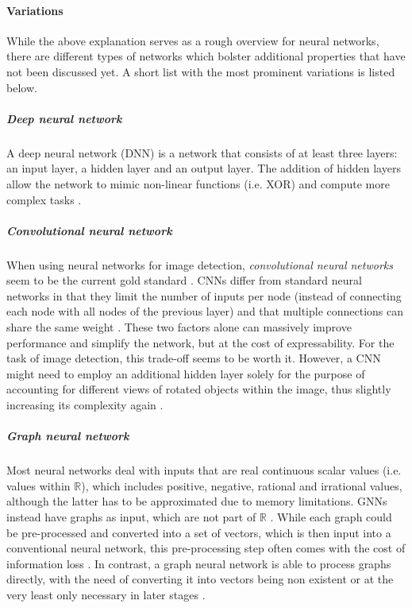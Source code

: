 \documentclass[draft,final]{vutinfth} %
\begin{document}
\paragraph{Variations} While the above explanation serves as a rough overview for neural networks, there are different types of networks which bolster additional properties that have not been discussed yet. A short list with the most prominent variations is listed below.

\subparagraph{Deep neural network} A deep neural network (DNN) is a network that consists of at least three layers: an input layer, a hidden layer and an output layer. The addition of hidden layers allow the network to mimic non-linear functions (i.e. XOR) and compute more complex tasks \cite{borisov2022deep}.

\subparagraph{Convolutional neural network} When using neural networks for image detection, \emph{convolutional neural networks} seem to be the current gold standard \cite{li2021survey}. CNNs differ from standard neural networks in that they limit the number of inputs per node (instead of connecting each node with all nodes of the previous layer) and that multiple connections can share the same weight \cite{li2021survey}. These two factors alone can massively improve performance and simplify the network, but at the cost of expressability. For the task of image detection, this trade-off seems to be worth it. However, a CNN might need to employ an additional hidden layer solely for the purpose of accounting for different views of rotated objects within the image, thus slightly increasing its complexity again \cite{li2021survey}.

\subparagraph{Graph neural network} Most neural networks deal with inputs that are real continuous scalar values (i.e. values within $\mathbb{R}$), which includes positive, negative, rational and irrational values, although the latter has to be approximated due to memory limitations. GNNs instead have graphs as input, which are not part of $\mathbb{R}$ \cite{scarselli2008graph}. While each graph could be pre-processed and converted into a set of vectors, which is then input into a conventional neural network, this pre-processing step often comes with the cost of information loss \cite{scarselli2008graph}. In contrast, a graph neural network is able to process graphs directly, with the need of converting it into vectors being non existent or at the very least only necessary in later stages \cite{scarselli2008graph}.
\end{document}
